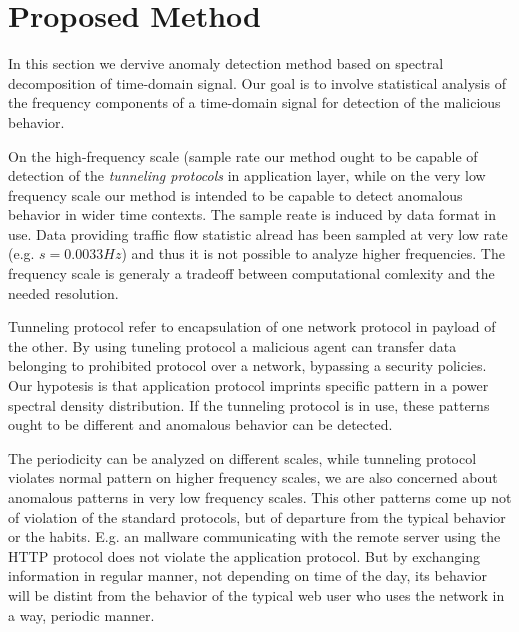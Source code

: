 
\chapter{Proposed Method}\label{ch:method}

In this section we dervive anomaly detection method based on spectral decomposition
of time-domain signal.
Our goal is to involve statistical analysis of the frequency components of a 
time-domain signal for detection of the malicious behavior.

On the high-frequency scale (sample rate our method ought to be capable of detection of the
\emph{tunneling protocols} in application layer, while on the very low frequency scale 
our method is intended to be capable to detect anomalous behavior in wider time contexts.
The sample reate is induced by data format in use. Data providing traffic flow statistic
alread has been sampled at very low rate (e.g. $s=0.0033Hz$) and thus it is not possible
to analyze higher frequencies. The frequency scale is generaly a tradeoff between
computational comlexity and the needed resolution.

Tunneling protocol refer to encapsulation of one network 
protocol in payload of the other. By using tuneling protocol a malicious agent can 
transfer data  belonging to prohibited protocol over a network, bypassing 
a security policies. Our hypotesis is that application protocol imprints 
specific pattern in a power spectral density distribution. If the tunneling protocol 
is in use, these patterns ought to be different and anomalous behavior can be detected.

The periodicity can be analyzed on different scales, while tunneling protocol
violates normal pattern on higher frequency scales, we are also concerned about anomalous
patterns in very low frequency scales. This other patterns come up not of violation 
of the standard protocols, but of departure from the typical behavior or the habits. 
E.g. an mallware communicating with the remote server using the HTTP protocol 
does not violate the application protocol. 
But by exchanging information in regular manner, not depending on time of the day,
its behavior will be distint from the behavior of the typical web user who uses the network
in a way, periodic manner.

